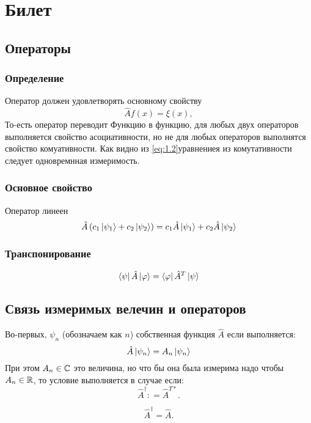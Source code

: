 \section{Билет}
\subsection{Операторы}
\subsubsection{Определение}
Оператор должен удовлетворять основному свойству
\begin{equation} 
 \hat A f(x) = \xi (x), 
\end{equation} 
То-есть оператор переводит Функцию в функцию, для 
любых двух операторов выполняется свойство асоциативности, 
но не для любых операторов выполнятся свойство комуативности. 
Как видно из \ref{eq:1.2}{уравнениея} из комутативности следует 
одновремнная измеримость.
\subsubsection{Основное свойство}
Оператор линеен
\begin{equation} 
  \hat A \left( c_1 \ket{\psi_1} + c_2 \ket{\psi_2} \right) = 
  c_1 \hat A \ket{\psi_1} + c_2 \hat A \ket{\psi_2}
\end{equation} 
\subsubsection{Транспонирование}
\begin{equation} 
 \bra{\psi} \hat A \ket{\varphi} = \bra{\varphi} \hat A^T \ket{\psi} 
\end{equation}

\subsection{Связь измеримых велечин и операторов}
Во-первых, $\psi_n$ (обозначаем как $n$) собственная функция 
$\hat A $ если выполняется:
\begin{equation} 
 \hat A \ket{\psi_n} = A_n \ket{\psi_n}
\end{equation} 
При этом $A_n \in \mathbb{C}$ это величина, но что бы она была измерима 
надо чтобы  $A_n \in \mathbb{R}$, то условие выполняется в случае если: 
\begin{equation} 
    \hat A^\dag : = \hat A^{T *}.
\end{equation} 

\begin{equation} 
    \hat A^\dag = \hat A.
\end{equation} 











